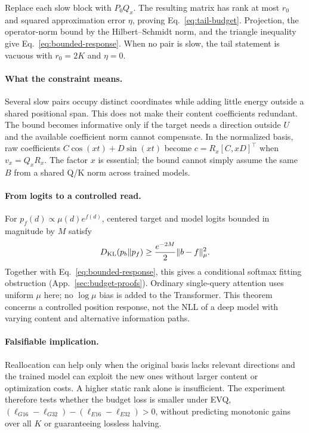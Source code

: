 Replace each slow block with $P_0Q_x$. The resulting matrix has rank at most
$r_0$ and squared approximation error $\eta$, proving
Eq.~\eqref{eq:tail-budget}. Projection, the operator-norm bound by the
Hilbert--Schmidt norm, and the triangle inequality give
Eq.~\eqref{eq:bounded-response}. When no pair is slow, the tail statement is
vacuous with $r_0=2K$ and $\eta=0$.

\paragraph{What the constraint means.}
Several slow pairs occupy distinct coordinates while adding little energy
outside a shared positional span. This does not make their content coefficients
redundant. The bound becomes informative only if the target needs a direction
outside $U$ and the available coefficient norm cannot compensate. In the
normalized basis, raw coefficients $C\cos(xt)+D\sin(xt)$ become
$c=R_x[C,xD]^\top$ when $v_x=Q_xR_x$. The factor $x$ is essential; the bound
cannot simply assume the same $B$ from a shared Q/K norm across trained models.

\paragraph{From logits to a controlled read.}
For $p_f(d)\propto\mu(d)e^{f(d)}$, centered target and model logits bounded
in magnitude by $M$ satisfy
\begin{equation}
D_{\rm KL}(p_b\Vert p_f)\ge\frac{e^{-2M}}{2}
\|b-f\|_\mu^2.
\end{equation}
Together with Eq.~\eqref{eq:bounded-response}, this gives a conditional
softmax fitting obstruction (App.~\ref{sec:budget-proofs}). Ordinary single-query
attention uses uniform $\mu$ here; no $\log\mu$ bias is added to the Transformer.
This theorem concerns a controlled position response, not the NLL of a deep
model with varying content and alternative information paths.

\paragraph{Falsifiable implication.}
Reallocation can help only when the original basis lacks relevant directions
and the trained model can exploit the new ones without larger content or
optimization costs. A higher static rank alone is insufficient. The experiment
therefore tests whether the budget loss is smaller under EVQ,
$(\ell_{G16}-\ell_{G32})-(\ell_{E16}-\ell_{E32})>0$, without predicting
monotonic gains over all $K$ or guaranteeing lossless halving.

